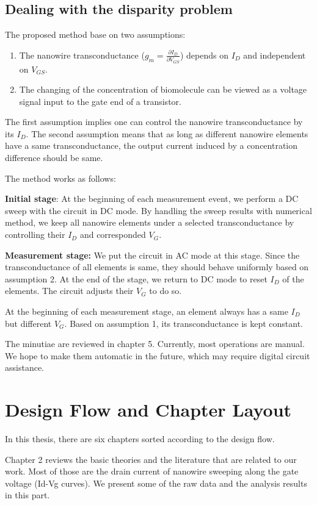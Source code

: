 \subsection*{Dealing with the disparity problem} \label{section:twqAssumption}
The proposed method base on two assumptions:
\begin{enumerate}
    \item The nanowire transconductance ($g_m = \frac{\partial I_D}{\partial V_{GS}}$) depends on $I_D$ and independent on $V_{GS}$.
    \item The changing of the concentration of biomolecule can be viewed as a voltage signal input to the gate end of a transistor.
\end{enumerate}
The first assumption implies one can control the nanowire transconductance by its $I_D$.
The second assumption means that as long as different nanowire elements have a same transconductance, the output current induced by a concentration difference should be same.

The method works as follows:

\textbf{Initial stage}: At the beginning of each measurement event, we perform a DC sweep with the circuit in DC mode.
By handling the sweep results with numerical method, we keep all nanowire elements under a selected transconductance by controlling their $I_D$ and corresponded $V_G$.

\textbf{Measurement stage:} We put the circuit in AC mode at this stage.
Since the transconductance of all elements is same, they should behave uniformly based on assumption 2.
At the end of the stage, we return to DC mode to reset $I_D$ of the elements.
The circuit adjusts their $V_G$ to do so.

At the beginning of each measurement stage, an element always has a same $I_D$ but different $V_G$.
Based on assumption 1, its transconductance is kept constant.


The minutiae are reviewed in chapter 5.
Currently, most operations are manual.
We hope to make them automatic in the future, which may require digital circuit assistance.

\section{Design Flow and Chapter Layout}
In this thesis, there are six chapters sorted according to the design flow.

Chapter 2 reviews the basic theories and the literature that are related to our work.
Most of those are the drain current of nanowire sweeping along the gate voltage (Id-Vg curves).
We present some of the raw data and the analysis results in this part.

